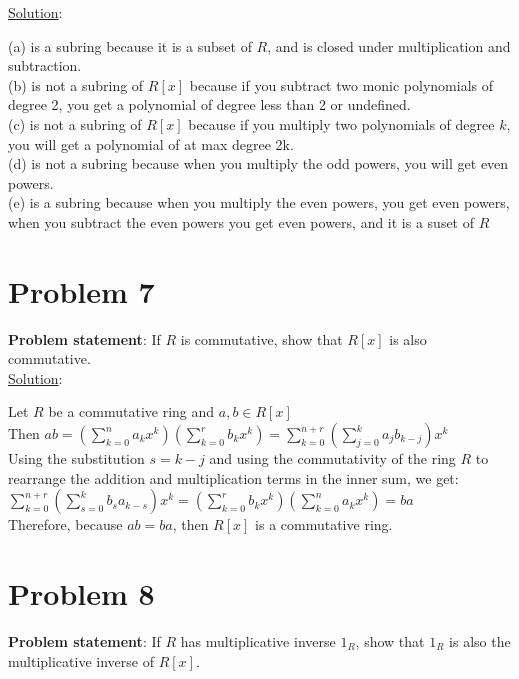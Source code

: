 \documentclass{article} %
\begin{document}
\underline{Solution}: 
\begin{addmargin}[1em]{0em}
(a) is a subring because it is a subset of $R$, and is closed under multiplication and subtraction.
\\(b) is not a subring of $R[x]$ because if you subtract two monic polynomials of degree 2, you get a polynomial of degree less than 2 or undefined.
\\(c) is not a subring of $R[x]$ because if you multiply two polynomials of degree $k$, you will get a polynomial of at max degree 2k.
\\(d) is not a subring because when you multiply the odd powers, you  will get even powers.
\\(e) is a subring because when you multiply the even powers, you get even powers, when you subtract the even powers you get even powers, and it is a suset of $R$
\end{addmargin}
\newpage
\section*{Problem 7}
\textbf{Problem statement}: If $R$ is commutative, show that $R[x]$ is also commutative.
\\

\underline{Solution}: 
\begin{addmargin}[1em]{0em}
Let $R$ be a commutative ring and $a, b \in R[x]$
\\Then $ab = (\sum_{k=0}^{n}{a_kx^k})(\sum_{k=0}^{r}{b_kx^k}) = \sum_{k=0}^{n+r}{(\sum_{j=0}^{k}{a_{j}b_{k-j}})x^k}$
\\Using the substitution $s = k - j$ and using the commutativity of the ring $R$ to rearrange the addition and multiplication terms in the inner sum, we get:
\\$\sum_{k=0}^{n+r}{(\sum_{s=0}^{k}{b_{s}a_{k-s}})x^k} = (\sum_{k=0}^{r}{b_kx^k})(\sum_{k=0}^{n}{a_kx^k}) = ba$
\\Therefore, because $ab = ba$, then $R[x]$ is a commutative ring.
\end{addmargin}
\newpage
\section*{Problem 8}
\textbf{Problem statement}: If $R$ has multiplicative inverse $1_R$, show that $1_R$ is also the multiplicative inverse of $R[x]$.
\\
\end{document}
